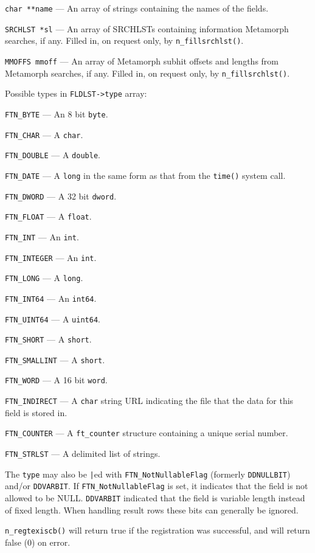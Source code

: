 \verb`char **name` --- An array of strings containing the names of the
fields.

\verb`SRCHLST *sl` --- An array of SRCHLSTs containing information
Metamorph searches, if any. Filled in, on request only,
by \verb`n_fillsrchlst()`.

\verb`MMOFFS mmoff` --- An array of Metamorph subhit offsets and lengths
from Metamorph searches, if any. Filled in, on request only,
by \verb`n_fillsrchlst()`.

Possible types in \verb`FLDLST->type` array:

\verb`FTN_BYTE` --- An 8 bit \verb`byte`.

\verb`FTN_CHAR` --- A \verb`char`.

\verb`FTN_DOUBLE` --- A \verb`double`.

\verb`FTN_DATE` --- A \verb`long` in the same form as that from the
\verb`time()` system call.

\verb`FTN_DWORD` --- A 32 bit \verb`dword`.

\verb`FTN_FLOAT` --- A \verb`float`.

\verb`FTN_INT` --- An \verb`int`.

\verb`FTN_INTEGER` --- An \verb`int`.

\verb`FTN_LONG` --- A \verb`long`.

\verb`FTN_INT64` --- An \verb`int64`.

\verb`FTN_UINT64` --- A \verb`uint64`.

\verb`FTN_SHORT` --- A \verb`short`.

\verb`FTN_SMALLINT` --- A \verb`short`.

\verb`FTN_WORD` --- A 16 bit \verb`word`.

\verb`FTN_INDIRECT` --- A \verb`char` string URL indicating the file that
the data for this field is stored in.

\verb`FTN_COUNTER` --- A \verb`ft_counter` structure containing a unique serial
number.

\verb`FTN_STRLST` --- A delimited list of strings.

The \verb`type` may also be \verb`|`ed with \verb`FTN_NotNullableFlag` (formerly \verb`DDNULLBIT`) and/or
\verb`DDVARBIT`.  If \verb`FTN_NotNullableFlag` is set, it indicates that the field is not
allowed to be NULL. \verb`DDVARBIT` indicated that the field is
variable length instead of fixed length. When handling result rows
these bits can generally be ignored.

\verb`n_regtexiscb()` will return true if the registration was successful,
and will return false (0) on error.


